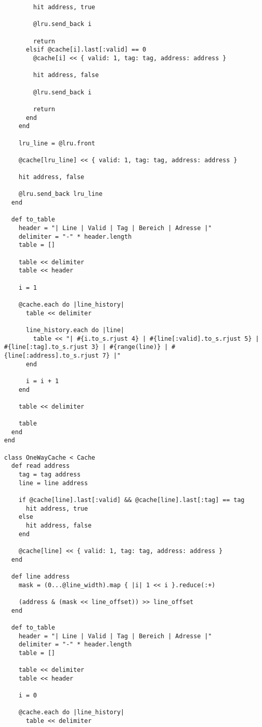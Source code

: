 \documentclass[10pt,a4paper]{article}
\begin{document}
\begin{lstlisting}
        hit address, true

        @lru.send_back i

        return
      elsif @cache[i].last[:valid] == 0
        @cache[i] << { valid: 1, tag: tag, address: address }

        hit address, false

        @lru.send_back i

        return
      end
    end

    lru_line = @lru.front

    @cache[lru_line] << { valid: 1, tag: tag, address: address }

    hit address, false

    @lru.send_back lru_line
  end

  def to_table
    header = "| Line | Valid | Tag | Bereich | Adresse |"
    delimiter = "-" * header.length
    table = []

    table << delimiter
    table << header

    i = 1

    @cache.each do |line_history|
      table << delimiter

      line_history.each do |line|
        table << "| #{i.to_s.rjust 4} | #{line[:valid].to_s.rjust 5} | #{line[:tag].to_s.rjust 3} | #{range(line)} | #{line[:address].to_s.rjust 7} |"
      end

      i = i + 1
    end

    table << delimiter

    table
  end
end

class OneWayCache < Cache
  def read address
    tag = tag address
    line = line address

    if @cache[line].last[:valid] && @cache[line].last[:tag] == tag
      hit address, true
    else
      hit address, false
    end

    @cache[line] << { valid: 1, tag: tag, address: address }
  end

  def line address
    mask = (0...@line_width).map { |i| 1 << i }.reduce(:+)

    (address & (mask << line_offset)) >> line_offset
  end

  def to_table
    header = "| Line | Valid | Tag | Bereich | Adresse |"
    delimiter = "-" * header.length
    table = []

    table << delimiter
    table << header

    i = 0

    @cache.each do |line_history|
      table << delimiter


\end{lstlisting}
\end{document}

